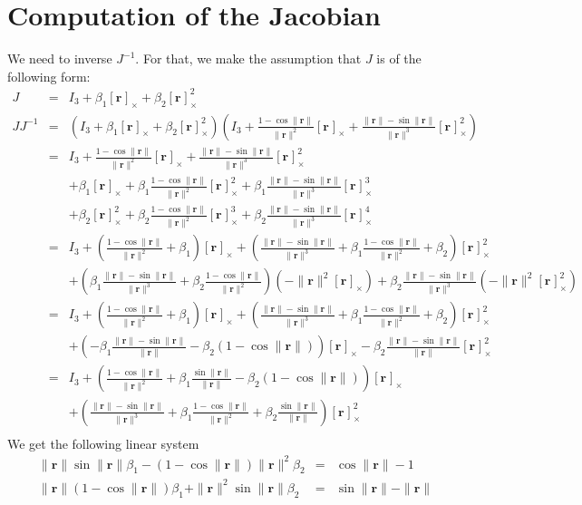 \documentclass {article}
\newcommand\rot{\mathbf{r}}
\newcommand\rcross[1]{[\rot_{#1}]_{\times}}
\newcommand\normr{\|\rot\|}
\begin{document}
\section{Computation of the Jacobian}

We need to inverse $J^{-1}$. For that, we make the assumption that $J$ is of the following form:
\begin{eqnarray*}
J &=& I_3 + \beta_1 \rcross{} + \beta_2 \rcross{}^2\\
JJ^{-1} &=& \left(I_3 + \beta_1 \rcross{} + \beta_2 \rcross{}^2\right)\left(I_3  + \frac{1 - \cos \normr}{\normr^2}\rcross{} + \frac{\normr -\sin\normr}{\normr^3}\rcross{}^2\right)\\
&=& I_3  + \frac{1 - \cos \normr}{\normr^2}\rcross{} + \frac{\normr -\sin\normr}{\normr^3}\rcross{}^2\\
&& +  \beta_1 \rcross{}  + \beta_1 \frac{1 - \cos \normr}{\normr^2}\rcross{}^2 + \beta_1 \frac{\normr -\sin\normr}{\normr^3}\rcross{}^3\\
&& +  \beta_2 \rcross{}^2  + \beta_2 \frac{1 - \cos \normr}{\normr^2}\rcross{}^3 + \beta_2 \frac{\normr -\sin\normr}{\normr^3}\rcross{}^4\\
&=& I_3 + \left(\frac{1 - \cos \normr}{\normr^2} + \beta_1\right)\rcross{} + \left(\frac{\normr -\sin\normr}{\normr^3} + \beta_1 \frac{1 - \cos \normr}{\normr^2} + \beta_2\right)\rcross{}^2\\
&& + \left(\beta_1 \frac{\normr -\sin\normr}{\normr^3} + \beta_2 \frac{1 - \cos \normr}{\normr^2}\right)(- \normr^2 \rcross{}) + \beta_2 \frac{\normr -\sin\normr}{\normr^3}(- \normr^2 \rcross{}^2)\\
&=& I_3 + \left(\frac{1 - \cos \normr}{\normr^2} + \beta_1\right)\rcross{} + \left(\frac{\normr -\sin\normr}{\normr^3} + \beta_1 \frac{1 - \cos \normr}{\normr^2} + \beta_2\right)\rcross{}^2\\
&& + \left(- \beta_1 \frac{\normr -\sin\normr}{\normr} - \beta_2 (1 - \cos \normr)\right)\rcross{} - \beta_2 \frac{\normr -\sin\normr}{\normr}\rcross{}^2\\
&=& I_3 + \left(\frac{1 - \cos \normr}{\normr^2} + \beta_1 \frac{\sin\normr}{\normr} - \beta_2 (1 - \cos \normr)\right)\rcross{} \\
&& + \left(\frac{\normr -\sin\normr}{\normr^3} + \beta_1 \frac{1 - \cos \normr}{\normr^2} + \beta_2 \frac{\sin\normr}{\normr}\right)\rcross{}^2 \\
\end{eqnarray*}
We get the following linear system
\begin{eqnarray*}
\normr\sin\normr \beta_1 - (1 - \cos \normr)\normr^2 \beta_2 &=& \cos \normr - 1 \\
\normr(1 - \cos \normr)\beta_1 + \normr^2\sin\normr \beta_2 &=& \sin\normr - \normr
\end{eqnarray*}
\end{document}

